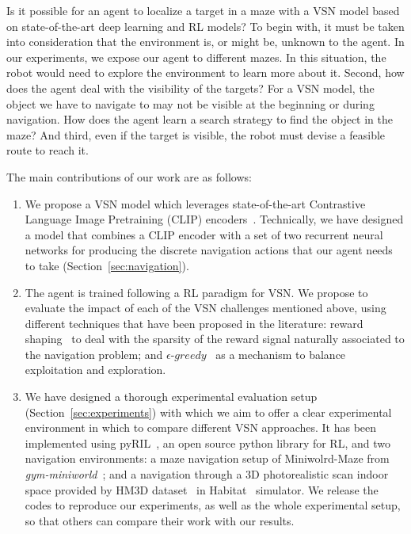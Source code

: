 Is it possible for an agent to localize a target in a maze with a VSN model based on state-of-the-art deep learning and RL models?
To begin with, it must be taken into consideration that the environment is, or might be, unknown to the agent.
In our experiments, we expose our agent to different mazes.
In this situation, the robot would need to explore the environment to learn more about it.
Second, how does the agent deal with the visibility of the targets?
For a VSN model, the object we have to navigate to may not be visible at the beginning or during navigation.
How does the agent learn a search strategy to find the object in the maze?
And third, even if the target is visible, the robot must devise a feasible route to reach it.



The main contributions of our work are as follows: 
\begin{enumerate}
 \item We propose a VSN model which leverages state-of-the-art Contrastive Language Image Pretraining (CLIP) encoders~\cite{radford2021}.
Technically, we have designed a model that combines a CLIP encoder with a set of two recurrent neural networks for producing the discrete navigation actions that our agent needs to take (Section~\ref{sec:navigation}).
  \item The agent is trained following a RL paradigm for VSN. We propose to evaluate the impact of each of the VSN challenges mentioned above, using different techniques that have been proposed in the literature: reward shaping~\cite{sutton2018, wijmans2020} to deal with the sparsity of the reward signal naturally associated to the navigation problem; and $\epsilon\text{-}greedy$~\cite{mnih2013} as a mechanism to balance exploitation and exploration.
  \item We have designed a thorough experimental evaluation setup (Section~\ref{sec:experiments}) with which we aim to offer a clear experimental environment in which to compare different VSN approaches.
 It has been implemented using pyRIL~\cite{pyRIL}, an open source python library for RL, and two navigation environments: a maze navigation setup of Miniwolrd-Maze from \textit{gym-miniworld}~\cite{gym_miniworld}; and a navigation through a 3D photorealistic scan indoor space provided by HM3D dataset~\cite{ramakrishnan2021} in Habitat~\cite{szot2021} simulator. 
 We release the codes to reproduce our experiments, as well as the whole experimental setup, so that others can compare their work with our results.
\end{enumerate}